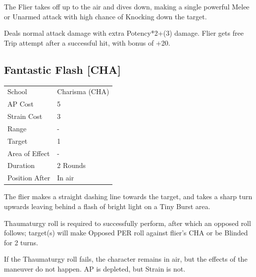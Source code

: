 \documentclass[11pt,a4paper,twocolumn]{book}
\begin{document}
\medskip

The Flier takes off up to the air and dives down, making a single powerful Melee or Unarmed attack with high chance of Knocking down the target.

Deals normal attack damage with extra Potency*2+(3) damage. Flier gets free Trip attempt after a successful hit, with bonus of +20.



\subsection*{Fantastic Flash [CHA]}
{
	\begin{tabu} to 75mm{| X[l,4] | X[l,7] |}
		\hline
		School 			& Charisma (CHA) 	\\
        AP Cost	      	& 5 				\\
        Strain Cost     & 3 				\\
        Range     		& - 				\\
        Target      	& 1 				\\
        Area of Effect  & - 	 			\\
        Duration     	& 2 Rounds	 		\\
		Position After  & In air 			\\ \hline
	\end{tabu}
		
}

\medskip

The flier makes a straight dashing line towards the target, and takes a sharp turn upwards leaving behind a flash of bright light on a Tiny Burst area.

Thaumaturgy roll is required to successfully perform, after which an opposed roll follows; target(s) will make Opposed PER roll against flier's CHA or be Blinded for 2 turns.

If the Thaumaturgy roll fails, the character remains in air, but the effects of the maneuver do not happen. AP is depleted, but Strain is not.

\vfill
\end{document}
